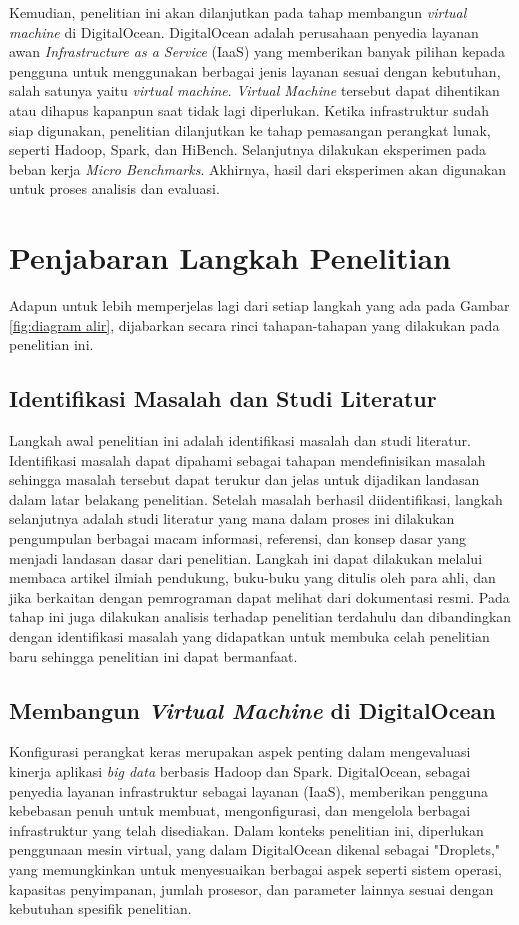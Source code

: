 Kemudian, penelitian ini akan dilanjutkan pada tahap membangun \textit{virtual machine} di DigitalOcean. DigitalOcean adalah perusahaan penyedia layanan awan \textit{Infrastructure as a Service} (IaaS) yang memberikan banyak pilihan kepada pengguna untuk menggunakan berbagai jenis layanan sesuai dengan kebutuhan, salah satunya yaitu \textit{virtual machine}. \textit{Virtual Machine} tersebut dapat dihentikan atau dihapus kapanpun saat tidak lagi diperlukan. Ketika infrastruktur sudah siap digunakan, penelitian dilanjutkan ke tahap pemasangan perangkat lunak, seperti Hadoop, Spark, dan HiBench. Selanjutnya dilakukan eksperimen pada beban kerja \textit{Micro Benchmarks}. Akhirnya, hasil dari eksperimen akan digunakan untuk proses analisis dan evaluasi.

\section{Penjabaran Langkah Penelitian}
Adapun untuk lebih memperjelas lagi dari setiap langkah yang ada pada Gambar \ref{fig:diagram alir}, dijabarkan secara rinci tahapan-tahapan yang dilakukan pada penelitian ini.

\subsection{Identifikasi Masalah dan Studi Literatur}
Langkah awal penelitian ini adalah identifikasi masalah dan studi literatur. Identifikasi masalah dapat dipahami sebagai tahapan mendefinisikan masalah sehingga masalah tersebut dapat terukur dan jelas untuk dijadikan landasan dalam latar belakang penelitian. Setelah masalah berhasil diidentifikasi, langkah selanjutnya adalah studi literatur yang mana dalam proses ini dilakukan pengumpulan berbagai macam informasi, referensi, dan konsep dasar yang menjadi landasan dasar dari penelitian. Langkah ini dapat dilakukan melalui membaca artikel ilmiah pendukung, buku-buku yang ditulis oleh para ahli, dan jika berkaitan dengan pemrograman dapat melihat dari dokumentasi resmi. Pada tahap ini juga dilakukan analisis terhadap penelitian terdahulu dan dibandingkan dengan identifikasi masalah yang didapatkan untuk membuka celah penelitian baru sehingga penelitian ini dapat bermanfaat. 

\subsection{Membangun \textit{Virtual Machine} di DigitalOcean}
Konfigurasi perangkat keras merupakan aspek penting dalam mengevaluasi kinerja aplikasi \textit{big data} berbasis Hadoop dan Spark. DigitalOcean, sebagai penyedia layanan infrastruktur sebagai layanan (IaaS), memberikan pengguna kebebasan penuh untuk membuat, mengonfigurasi, dan mengelola berbagai infrastruktur yang telah disediakan. Dalam konteks penelitian ini, diperlukan penggunaan mesin virtual, yang dalam DigitalOcean dikenal sebagai "Droplets," yang memungkinkan untuk menyesuaikan berbagai aspek seperti sistem operasi, kapasitas penyimpanan, jumlah prosesor, dan parameter lainnya sesuai dengan kebutuhan spesifik penelitian.

